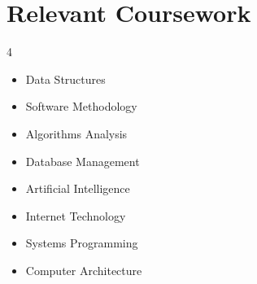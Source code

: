 \section{Relevant Coursework}
        \begin{multicols}{4}
            \begin{itemize}[itemsep=-5pt, parsep=3pt]
                \item\small Data Structures
                \item Software Methodology
                \item Algorithms Analysis
                \item Database Management
                \item Artificial Intelligence
                \item Internet Technology
                \item Systems Programming
                \item Computer Architecture
            \end{itemize}
        \end{multicols}
        \vspace*{2.0\multicolsep}
